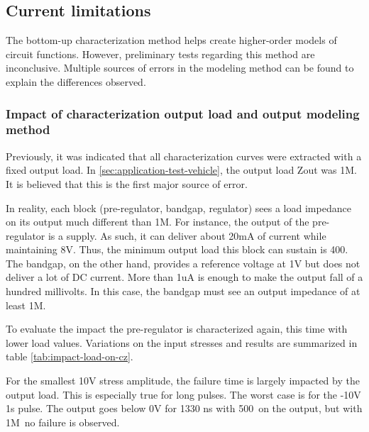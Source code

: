 \subsection{Current limitations}
\label{sec:current-limitations}
The bottom-up characterization method helps create higher-order models of circuit functions.
However, preliminary tests regarding this method are inconclusive.
Multiple sources of errors in the modeling method can be found to explain the differences observed.

\subsubsection{Impact of characterization output load and output modeling method}

Previously, it was indicated that all characterization curves were extracted with a fixed output load.
In \ref{sec:application-test-vehicle}, the output load Zout was 1M\textOmega.
It is believed that this is the first major source of error.

In reality, each block (pre-regulator, bandgap, regulator) sees a load impedance on its output much different than 1M\textOmega.
For instance, the output of the pre-regulator is a supply.
As such, it can deliver about 20mA of current while maintaining 8V.
Thus, the minimum output load this block can sustain is 400\textOmega.
The bandgap, on the other hand, provides a reference voltage at 1V but does not deliver a lot of DC current.
More than 1uA is enough to make the output fall of a hundred millivolts.
In this case, the bandgap must see an output impedance of at least 1M\textOmega.

To evaluate the impact the pre-regulator is characterized again, this time with lower load values.
Variations on the input stresses and results are summarized in table \ref{tab:impact-load-on-cz}.

For the smallest 10V stress amplitude, the failure time is largely impacted by the output load.
This is especially true for long pulses.
The worst case is for the -10V 1\textmugreek{}s pulse.
The output goes below 0V for 1330 ns with 500\textOmega\ on the output, but with 1M\textOmega\, no failure is observed.

